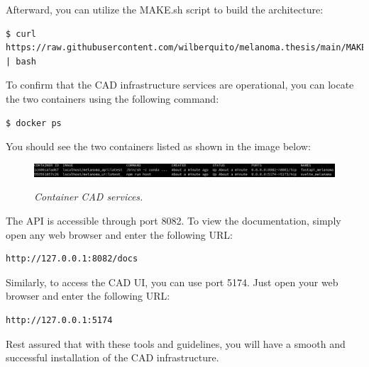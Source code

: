 Afterward, you can utilize the MAKE.sh script to build the architecture:

\begin{Verbatim}[fontsize=\scriptsize]
$ curl https://raw.githubusercontent.com/wilberquito/melanoma.thesis/main/MAKE.sh | bash
\end{Verbatim}

To confirm that the CAD infrastructure services are operational,
you can locate the two containers using the following command:

\begin{Verbatim}[fontsize=\scriptsize]
$ docker ps
\end{Verbatim}

You should see the two containers listed as shown in the image below:

\begin{figure}[H]
\centering
\includegraphics[width=\textwidth]{imatges/appendices/services.png}
\caption[Container CAD services]{\textit{Container CAD services.}}
{\label{fig:polling-layer}}
\end{figure}

The API is accessible through port 8082. To view the documentation, simply open any web browser and enter the following URL:

\begin{Verbatim}[fontsize=\scriptsize]
http://127.0.0.1:8082/docs
\end{Verbatim}

Similarly, to access the CAD UI, you can use port 5174. Just open your web browser and enter the following URL:

\begin{Verbatim}[fontsize=\scriptsize]
http://127.0.0.1:5174
\end{Verbatim}

Rest assured that with these tools and guidelines,
you will have a smooth and successful installation of the CAD infrastructure.
